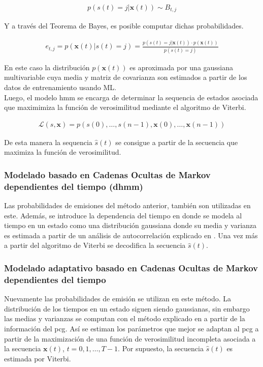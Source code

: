 \begin{align}
    p(s(t) = j | \mathbf{x}(t)) \sim B_{t,j}
\end{align}

\indent Y a través del Teorema de Bayes, es posible computar dichas probabilidades.

\begin{align}
    e_{t,j} = p(\mathbf{x}(t)|s(t)=j) = \frac{p(s(t) = j|\mathbf{x}(t)) \cdot p(\mathbf{x}(t))}{p(s(t) = j)}
\end{align}

\indent En este caso la distribución $p(\mathbf{x}(t))$ es aproximada por una gaussiana multivariable cuya media y matriz de covarianza son estimados a partir de los datos de entrenamiento usando ML. \\
\indent Luego, el modelo \acrshort{hmm} se encarga de determinar la sequencia de estados asociada que maximimiza la función de verosimilitud mediante el algoritmo de Viterbi.

\begin{align}
    \mathcal{L}(s,\mathbf{x}) = p(s(0),\dots,s(n-1),\mathbf{x}(0),\dots,\mathbf{x}(n-1))
\end{align}

\indent De esta manera la sequencia $\hat{s}(t)$ se consigue a partir de la secuencia que maximiza la función de verosimilitud.

\subsubsection*{Modelado basado en Cadenas Ocultas de Markov dependientes del tiempo (\acrshort{dhmm})}

\indent Las probabilidades de emisiones del método anterior, también son utilizadas en este. Además, se introduce la dependencia del tiempo en donde se modela al tiempo en un estado como una distribución gaussiana donde su media y varianza es estimada a partir de un análisis de autocorrelación explicado en \cite{pp:schmidt2010}. Una vez más a partir del algoritmo de Viterbi se decodifica la secuencia $\hat{s}(t)$. 

\subsubsection*{Modelado adaptativo basado en Cadenas Ocultas de Markov dependientes del tiempo}

\indent Nuevamente las probabilidades de emisión se utilizan en este método. La distribución de los tiempos en un estado siguen siendo gaussianas, sin embargo las medias y varianzas se computan con el método explicado en \cite{pp:oliveira-renna-coimbra} a partir de la información del \acrshort{pcg}. Así se estiman los parámetros que mejor se adaptan al \acrshort{pcg} a partir de la maximización de una función de verosimilitud incompleta asociada a la secuencia $\mathbf{x}(t)$, $t=0,1,\dots,T-1$. Por supuesto, la secuencia $\hat{s}(t)$ es estimada por Viterbi.